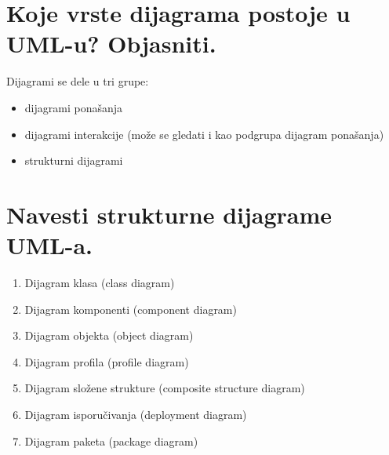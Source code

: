 \documentclass[a4paper]{article}
\begin{document}
\section{Koje vrste dijagrama postoje u UML-u? Objasniti.}
  Dijagrami se dele u tri grupe:
  \begin{itemize}
    \item dijagrami ponašanja
    \item dijagrami interakcije (može se gledati i kao podgrupa dijagram ponašanja)
    \item strukturni dijagrami
  \end{itemize}

\section{Navesti strukturne dijagrame UML-a.}
  \begin{enumerate}
    \item Dijagram klasa (class diagram)
    \item Dijagram komponenti (component diagram)
    \item Dijagram objekta (object diagram)
    \item Dijagram profila (profile diagram)
    \item Dijagram složene strukture (composite structure diagram)
    \item Dijagram isporučivanja (deployment diagram)
    \item Dijagram paketa (package diagram)
  \end{enumerate}
\end{document}
